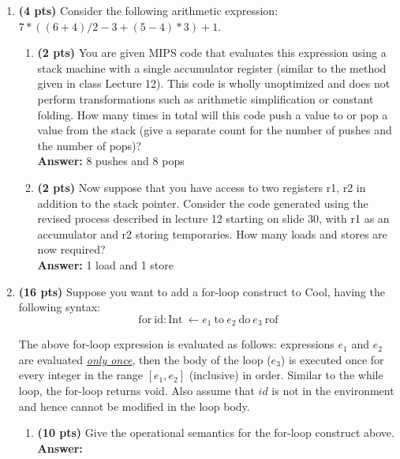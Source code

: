 \documentclass[11pt]{article}
\begin{document}
\begin{enumerate}
\begin{enumerate}
   \newpage
    
  \end{enumerate}
  
  \item \textbf{(4 pts)} Consider the following arithmetic expression: $7*((6+4)/2 - 3 + (5-4)*3) + 1$.
  
  \begin{enumerate}
    \item \textbf{(2 pts)} You are given MIPS code that evaluates this expression using a stack machine with a single accumulator register (similar to the method given in class Lecture 12). This code is wholly unoptimized and does not perform transformations such as arithmetic simplification or constant folding. How many times in total will this code push a value to or pop a value from the stack (give a separate count for the number of pushes and the number of pops)?\\
    \textbf{Answer:} 
    8 pushes and 8 pops
    
   \newpage
    \item \textbf{(2 pts)} Now suppose that you have access to two registers r1, r2 in addition to the stack pointer. Consider the code generated using the revised process described in lecture 12 starting on slide 30, with r1 as an accumulator and r2 storing temporaries. How many loads and stores are now required?\\
    \textbf{Answer:} 
    1 load and 1 store
    
   \newpage
  \end{enumerate}
    
  \item \textbf{(16 pts)} Suppose you want to add a for-loop construct to Cool, having the following syntax:\\
  
  $$\mbox{for}\ \mbox{id}: \mbox{Int}\ \leftarrow e_1\ \mbox{to}\ e_2\ \mbox{do}\ e_3\ \mbox{rof}$$ 
  
  The above for-loop expression is evaluated as follows: expressions $e_1$ and $e_2$ are evaluated \underline{\emph{only once}}, then the body of the loop ($e_3$) is executed once for every integer in the range $[e_1, e_2]$ (inclusive) in order. Similar to the while loop, the for-loop returns void. Also assume that $id$ is not in the environment and hence cannot be modified in the loop body.
  
   \begin{enumerate}
    \item \textbf{(10 pts)} Give the operational semantics for the for-loop construct above.\\
    \textbf{Answer:} 
    

\end{enumerate}
\end{enumerate}
\end{document}
